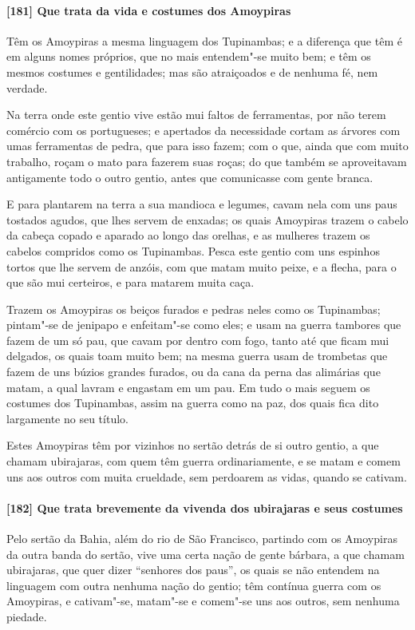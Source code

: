 \paragraph{[181] Que trata da vida e costumes dos Amoypiras}\quad
Têm os Amoypiras a mesma linguagem dos Tupinambas; e a diferença que têm é em alguns nomes
próprios, que no mais entendem"-se muito bem; e têm os mesmos costumes e gentilidades; mas
são atraiçoados e de nenhuma fé, nem verdade.

Na terra onde este gentio vive estão mui faltos de ferramentas, por não terem comércio com
os portugueses; e apertados da necessidade cortam as árvores com umas ferramentas de
pedra, que para isso fazem; com o que, ainda que com muito trabalho, roçam o mato para
fazerem suas roças; do que também se aproveitavam antigamente todo o outro gentio, antes
que comunicasse com gente branca.

E para plantarem na terra a sua mandioca e legumes, cavam nela com uns paus tostados
agudos, que lhes servem de enxadas; os quais Amoypiras trazem o cabelo da cabeça copado e
aparado ao longo das orelhas, e as mulheres trazem os cabelos compridos como os
Tupinambas. Pesca este gentio com uns espinhos tortos que lhe servem de anzóis, com que
matam muito peixe, e a flecha, para o que são mui certeiros, e para matarem muita caça.

Trazem os Amoypiras os beiços furados e pedras neles como os Tupinambas; pintam"-se de
jenipapo e enfeitam"-se como eles; e usam na guerra tambores que fazem de um só pau, que
cavam por dentro com fogo, tanto até que ficam mui delgados, os quais toam muito bem; na
mesma guerra usam de trombetas que fazem de uns búzios grandes furados, ou da cana da
perna das alimárias que matam, a qual lavram e engastam em um pau. Em tudo o mais seguem
os costumes dos Tupinambas, assim na guerra como na paz, dos quais fica dito largamente no
seu título.

Estes Amoypiras têm por vizinhos no sertão detrás de si outro gentio, a que chamam
ubirajaras, com quem têm guerra ordinariamente, e se matam e comem uns aos outros com
muita crueldade, sem perdoarem as vidas, quando se cativam.

\paragraph{[182] Que trata brevemente da vivenda dos ubirajaras e seus costumes}\quad
Pelo sertão da Bahia, além do rio de São Francisco, partindo com os Amoypiras da outra
banda do sertão, vive uma certa nação de gente bárbara, a que chamam ubirajaras, que quer
dizer ``senhores dos paus'', os quais se não entendem na linguagem com outra nenhuma nação
do gentio; têm contínua guerra com os Amoypiras, e cativam"-se, matam"-se e comem"-se uns aos
outros, sem nenhuma piedade.


